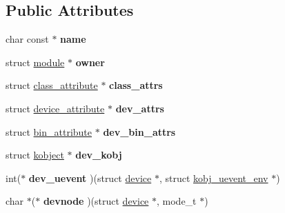 \subsection*{Public Attributes}
\begin{DoxyCompactItemize}
\item 
\hypertarget{structclass_ad35703f4364e4dece2c7ab272e46ffb5}{}char const $\ast$ {\bfseries name}\label{structclass_ad35703f4364e4dece2c7ab272e46ffb5}

\item 
\hypertarget{structclass_ac1625f17c74634d946335b6254fbbfd2}{}struct \hyperlink{structmodule}{module} $\ast$ {\bfseries owner}\label{structclass_ac1625f17c74634d946335b6254fbbfd2}

\item 
\hypertarget{structclass_a38a8363ddb032de8d5bcfd8be6f32aef}{}struct \hyperlink{structclass__attribute}{class\+\_\+attribute} $\ast$ {\bfseries class\+\_\+attrs}\label{structclass_a38a8363ddb032de8d5bcfd8be6f32aef}

\item 
\hypertarget{structclass_a51e6c357a528a74d940d6cba0c350e54}{}struct \hyperlink{structdevice__attribute}{device\+\_\+attribute} $\ast$ {\bfseries dev\+\_\+attrs}\label{structclass_a51e6c357a528a74d940d6cba0c350e54}

\item 
\hypertarget{structclass_ae6ca3d615a2be39a996e965398991e80}{}struct \hyperlink{structbin__attribute}{bin\+\_\+attribute} $\ast$ {\bfseries dev\+\_\+bin\+\_\+attrs}\label{structclass_ae6ca3d615a2be39a996e965398991e80}

\item 
\hypertarget{structclass_ad95f2cd31ac8d9309e3377e2896543d0}{}struct \hyperlink{structkobject}{kobject} $\ast$ {\bfseries dev\+\_\+kobj}\label{structclass_ad95f2cd31ac8d9309e3377e2896543d0}

\item 
\hypertarget{structclass_ac3cf51e2b7535985c1ca566e6db1f20d}{}int($\ast$ {\bfseries dev\+\_\+uevent} )(struct \hyperlink{structdevice}{device} $\ast$, struct \hyperlink{structkobj__uevent__env}{kobj\+\_\+uevent\+\_\+env} $\ast$)\label{structclass_ac3cf51e2b7535985c1ca566e6db1f20d}

\item 
\hypertarget{structclass_ab78cec7286cdd8ef52e42dd637e3e6f1}{}char $\ast$($\ast$ {\bfseries devnode} )(struct \hyperlink{structdevice}{device} $\ast$, mode\+\_\+t $\ast$)\label{structclass_ab78cec7286cdd8ef52e42dd637e3e6f1}


\end{DoxyCompactItemize}
